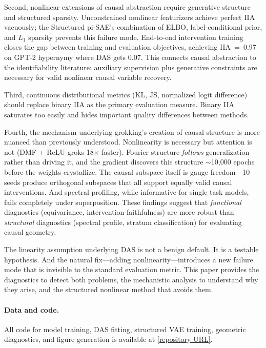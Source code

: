 \documentclass{article}
\begin{document}
Second, nonlinear extensions of causal abstraction require generative structure
and structured sparsity. Unconstrained nonlinear featurizers achieve perfect IIA
vacuously; the Structured pi-SAE's combination of ELBO, label-conditional prior,
and $L_1$ sparsity prevents this failure mode. End-to-end intervention training
closes the gap between training and evaluation objectives, achieving IIA~=~0.97
on GPT-2 hypernymy where DAS gets 0.07. This connects causal abstraction to the
identifiability literature: auxiliary supervision plus generative constraints are
necessary for valid nonlinear causal variable recovery.

Third, continuous distributional metrics (KL, JS, normalized logit difference)
should replace binary IIA as the primary evaluation measure. Binary IIA
saturates too easily and hides important quality differences between methods.

Fourth, the mechanism underlying grokking's creation of causal structure is
more nuanced than previously understood. Nonlinearity is necessary but
attention is not (DMF + ReLU groks 18$\times$ faster). Fourier structure
\emph{follows} generalization rather than driving it, and the gradient
discovers this structure $\sim$10{,}000 epochs before the weights crystallize.
The causal subspace itself is gauge freedom---10 seeds produce orthogonal
subspaces that all support equally valid causal interventions. And spectral
profiling, while informative for single-task models, fails completely under
superposition. These findings suggest that \emph{functional} diagnostics
(equivariance, intervention faithfulness) are more robust than
\emph{structural} diagnostics (spectral profile, stratum classification)
for evaluating causal geometry.

The linearity assumption underlying DAS is not a benign default. It is a testable
hypothesis. And the natural fix---adding nonlinearity---introduces a new failure
mode that is invisible to the standard evaluation metric. This paper provides
the diagnostics to detect both problems, the mechanistic analysis to understand
why they arise, and the structured nonlinear method that avoids them.

\paragraph{Data and code.} All code for model training, DAS fitting, structured
VAE training, geometric diagnostics, and figure generation is available at
\url{[repository URL]}.



\end{document}
